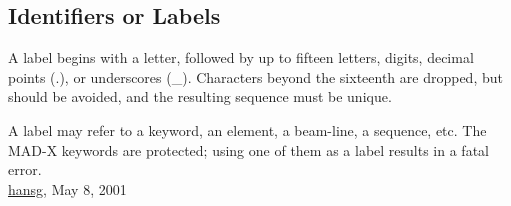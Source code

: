 




\subsection{Identifiers or Labels}
  A label begins with a letter, followed by up to fifteen letters, digits, decimal points (.), or underscores (\_). Characters beyond the sixteenth are dropped, but should be avoided, and the resulting sequence must be unique. 

  A label may refer to a keyword, an element, a beam-line, a sequence, etc.   The MAD-X keywords are protected; using one of them as a label results in a fatal error.  
\\
\href{http://www.cern.ch/Hans.Grote/hansg_sign.html}{hansg}, May 8, 2001 

